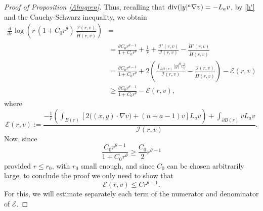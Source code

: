 \documentclass[11pt]{amsart}
\theoremstyle{plain}
\numberwithin{equation}{section}
\begin{document}
\begin{proof}[Proof of Proposition \ref{Almgren}]
Thus, recalling that ${{\rm div}} (|y|^{a}\nabla v)=-L_a v$, by \eqref{h'} and the Cauchy-Schwarz inequality, we obtain
\[\begin{split}
\frac{d}{dr}\log\left( r\,(1+C_0r^\theta)\,\frac{\mathcal{I}(r,v)}{\tilde{H}(r,v)} \right)&=\\
&= \frac{\theta C_0r^{\theta-1}}{1+C_0r^\theta} + \frac1r +\frac{\mathcal{I}'(r,v)}{\mathcal{I}(r,v)}-\frac{\tilde{H}'(r,v)}{\tilde{H}(r,v)}\\
&= \frac{\theta C_0r^{\theta-1}}{1+C_0r^\theta}+ 2\left(\frac{\int_{\partial{B(r)}}|y|^av_\nu^2}{\mathcal{I}(r,v)}-\frac{\mathcal{I}(r,v)}{\tilde{H}(r,v)}\right) -\mathcal{E}(r,v)\\
&\geq\frac{\theta C_0r^{\theta-1}}{1+C_0r^\theta}-\mathcal{E}(r,v),
\end{split}\]
where
\begin{equation}\label{E}
\mathcal{E}(r,v):=\frac{-\frac{1}{r}\left(\int_{B(r)}{\left[2\bigl((x,y)\cdot\nabla v\bigr)+(n+a-1)v\right]L_a v}\right)+\int_{\partial {B(r)}}{vL_a v}}{\mathcal{I}(r,v)}.
\end{equation}
Now, since
\[\frac{C_0r^{\theta-1}}{1+C_0r^\theta}\geq \frac{C_0}{2}r^{\theta-1}\]
provided $r \leq r_0$, with $r_0$ small enough,
and since $C_0$ can be chosen arbitrarily large, to conclude the proof we only need to show that
\begin{equation}\label{we-want}
\mathcal{E}(r,v)\leq Cr^{\theta-1}.
\end{equation}
For this, we will estimate separately each term of the numerator and denominator of $\mathcal{E}$.


\end{proof}
\end{document}
